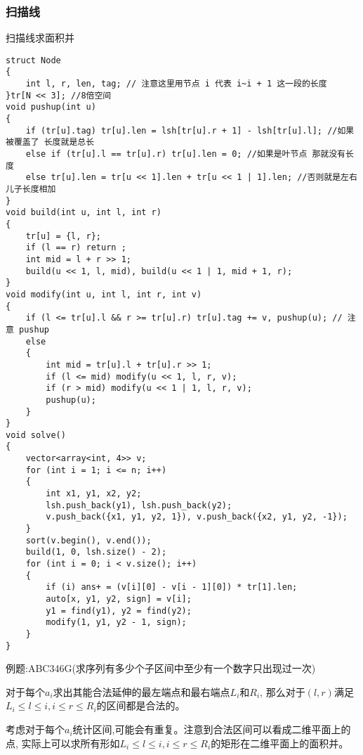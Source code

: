 \documentclass[a4paper,fontset=none]{ctexart}
\begin{document}
\subsubsection{扫描线}
扫描线求面积并
\begin{verbatim}
struct Node
{
    int l, r, len, tag; // 注意这里用节点 i 代表 i~i + 1 这一段的长度
}tr[N << 3]; //8倍空间
void pushup(int u)
{
    if (tr[u].tag) tr[u].len = lsh[tr[u].r + 1] - lsh[tr[u].l]; //如果被覆盖了 长度就是总长
    else if (tr[u].l == tr[u].r) tr[u].len = 0; //如果是叶节点 那就没有长度
    else tr[u].len = tr[u << 1].len + tr[u << 1 | 1].len; //否则就是左右儿子长度相加
}
void build(int u, int l, int r)
{
    tr[u] = {l, r};
    if (l == r) return ;
    int mid = l + r >> 1;
    build(u << 1, l, mid), build(u << 1 | 1, mid + 1, r);
}
void modify(int u, int l, int r, int v)
{
    if (l <= tr[u].l && r >= tr[u].r) tr[u].tag += v, pushup(u); // 注意 pushup
    else
    {
        int mid = tr[u].l + tr[u].r >> 1;
        if (l <= mid) modify(u << 1, l, r, v);
        if (r > mid) modify(u << 1 | 1, l, r, v);
        pushup(u);
    }
}
void solve()
{
    vector<array<int, 4>> v;
    for (int i = 1; i <= n; i++)
    {
        int x1, y1, x2, y2;
        lsh.push_back(y1), lsh.push_back(y2);
        v.push_back({x1, y1, y2, 1}), v.push_back({x2, y1, y2, -1});
    }
    sort(v.begin(), v.end());
    build(1, 0, lsh.size() - 2);
    for (int i = 0; i < v.size(); i++)
    {
        if (i) ans+ = (v[i][0] - v[i - 1][0]) * tr[1].len;
        auto[x, y1, y2, sign] = v[i];
        y1 = find(y1), y2 = find(y2);
        modify(1, y1, y2 - 1, sign);
    }
}
\end{verbatim}

例题:ABC346G(求序列有多少个子区间中至少有一个数字只出现过一次)

对于每个$a_i$求出其能合法延伸的最左端点和最右端点$L_i$和$R_i$,
那么对于$(l,r)$满足$L_i\leqslant l\leqslant i,i\leqslant r\leqslant R_i$的区间都是合法的。

考虑对于每个$a_i$统计区间,可能会有重复。注意到合法区间可以看成二维平面上的点,
实际上可以求所有形如$L_i\leqslant l\leqslant i,i\leqslant r\leqslant R_i$的矩形在二维平面上的面积并。
\end{document}
